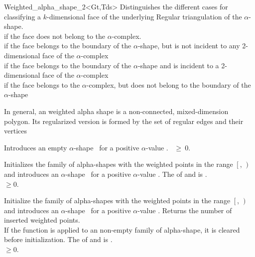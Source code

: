 \begin{ccClassTemplate} {Weighted_alpha_shape_2<Gt,Tds>}
{Distinguishes the different cases for classifying a $k$-dimensional face
 of the underlying Regular triangulation of the $\alpha$-shape. \\
 if the face does not belong to the $\alpha$-complex.\\
 if the face belongs to the boundary of the $\alpha$-shape,
 but is not incident to any 2-dimensional face of the $\alpha$-complex\\
 if the face belongs to the boundary of the $\alpha$-shape
 and is incident to a 2-dimensional face of the $\alpha$-complex\\
 if the face belongs to the $\alpha$-complex, but does
not belong to the boundary of the $\alpha$-shape\\}

{ In general, an weighted alpha shape is a non-connected, mixed-dimension
polygon. Its regularized version is formed by the set of regular edges
and their vertices}

\ccCreation
{}

{Introduces an empty $\alpha$-shape \ccVar\ for a positive $\alpha$-value
 .
\ccPrecond {}~$\geq~0$.}


{Initializes the family of alpha-shapes with the weighted points in the range
$\left[\right.$, $\left.\right)$ and 
introduces an $\alpha$-shape \ccVar\ for a positive $\alpha$-value
.  
\ccPrecond The  of  and
 is .\\
 $\geq 0$.}

\ccOperations

{Initialize the family of alpha-shapes with the weighted points in the range
$\left[\right.$, $\left.\right)$ and 
introduces an $\alpha$-shape \ccVar\ for a positive $\alpha$-value
. Returns the number of inserted weighted points. \\
If the function is applied to an non-empty family of alpha-shape, it is cleared
before initialization.
\ccPrecond The  of  and
 is .\\
 $\geq 0$.}


\end{ccClassTemplate}
